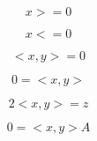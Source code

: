 \documentclass{article}
\begin{document}
\[ x >= 0 \]

\[ x <= 0 \]

\[ <x, y> = 0 \]

\[ 0 = <x,y> \]

\[ 2<x,y> = z \]

\[ 0 = <x,y>A \]
\end{document}
